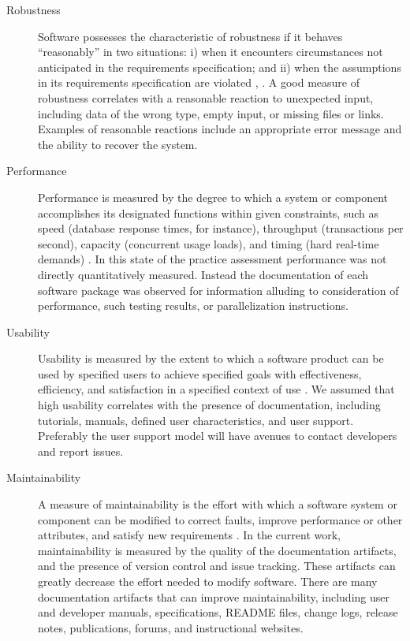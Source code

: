 \documentclass[final, 3p, times, authoryear]{elsarticle}
\begin{document}
\begin{description}
	\item[Robustness] Software possesses the characteristic of robustness if it
	behaves ``reasonably'' in two situations: i) when it encounters
	circumstances not anticipated in the requirements specification; and ii)
	when the assumptions in its requirements specification are violated
	\citep{boehm2007software}, \citep[p.\ 19]{GhezziEtAl2003}. A good measure of
	robustness correlates with a reasonable reaction to unexpected input,
	including data of the wrong type, empty input, or missing files or links.
	Examples of reasonable reactions include an appropriate error message and the
	ability to recover the system.
	
	\item[Performance] Performance is measured by the degree to which a system
	or component accomplishes its designated functions within given constraints,
	such as speed (database response times, for instance), throughput
	(transactions per second), capacity (concurrent usage loads), and timing
	(hard real-time demands) \citep{IEEEStdGlossarySET1990, wiegers2003softreq}.
	In this state of the practice assessment performance was not directly
	quantitatively measured. Instead the documentation of each software package
	was observed for information alluding to consideration of performance, such
	testing results, or parallelization instructions. 
	
	\item[Usability] Usability is measured by the extent to which a software
	product can be used by specified users to achieve specified goals with
	effectiveness, efficiency, and satisfaction in a specified context of use
	\citep{nielsonusability}. We assumed that high usability correlates with
	the presence of documentation, including tutorials, manuals, defined
	user characteristics, and user support. Preferably the user support model
	will have avenues to contact developers and report issues.
	
	\item[Maintainability] A measure of maintainability is the effort with which
	a software system or component can be modified to correct faults, improve
	performance or other attributes, and satisfy new requirements
	\citep{IEEEStdGlossarySET1990, boehm2007software}. In the current work,
	maintainability is measured by the quality of the documentation artifacts,
	and the presence of version control and issue tracking. These artifacts can
	greatly decrease the effort needed to modify software. There are many
	documentation artifacts that can improve maintainability, including user and
	developer manuals, specifications, README files, change logs, release notes,
	publications, forums, and instructional websites. 


\end{description}
\end{document}
